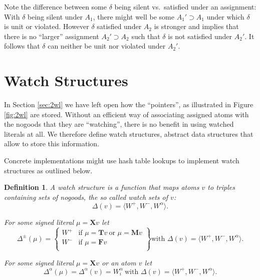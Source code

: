 \documentclass{vutinfth} %
\newtheorem{definition}{Definition}[section]
\newcommand{\ass}{A}
\newcommand{\bT}{\mathbf{T}}
\newcommand{\bM}{\mathbf{M}}
\newcommand{\bF}{\mathbf{F}}
\newcommand{\bX}{\mathbf{X}}
\newcommand{\dpm}{\Delta^\pm}
\newcommand{\dal}{\Delta^\alpha}
\newcommand{\sgl}{\mu}
\begin{document}
Note the difference between some $\delta$ being silent vs.~satisfied under an assignment: With $\delta$ being silent under $\ass_1$, there might well be some $\ass_1' \supset \ass_1$ under which $\delta$ is unit or violated. However $\delta$ satisfied under $\ass_2$ is stronger and implies that there is no \enquote{larger} assignment $\ass_2' \supset \ass_2$ such that $\delta$ is not satisfied under $\ass_2'$. It follows that $\delta$ can neither be unit nor violated under $\ass_2'$.

\section{Watch Structures}

In Section \ref{sec:2wl} we have left open how the \enquote{pointers}, as illustrated in Figure \ref{fig:2wl} are stored. Without an efficient way of associating assigned atoms with the nogoods that they are \enquote{watching}, there is no benefit in using watched literals at all. We therefore define watch structures, abstract data structures that allow to store this information.

Concrete implementations might use hash table lookups to implement watch structures as outlined below.



\begin{definition}
A \emph{watch structure} is a function that maps atoms $v$ to triples containing sets of nogoods, the so called \emph{watch sets} of $v$: $$\Delta(v) = \langle W^+, W^-, W^\alpha \rangle .$$


For some signed literal $\sgl = \bX v$ let $$\dpm(\sgl) = \left\{\begin{array}{ll}
        W^+ & \text{if } \sgl = \bT v \ \text{or } \sgl = \bM v\\
        W^- & \text{if } \sgl = \bF v \\
        \end{array}\right\} \text{with } \Delta(v) = \langle W^+, W^-, W^\alpha \rangle .$$

For some signed literal $\sgl = \bX v$ or an atom $v$ let $$\dal(\sgl) = \dal(v) = W_i^\alpha \ \text{with } \Delta(v) = \langle W^+, W^-, W^\alpha \rangle .$$
\end{definition}
\end{document}
